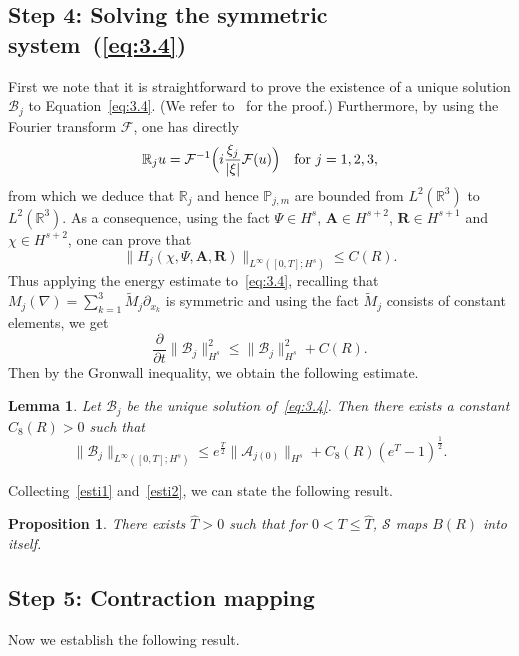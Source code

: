 \documentclass[10pt]{amsart}
\newtheorem{lemm}[theo]{Lemma}\newtheorem{prop}[theo]{Proposition}\newtheorem{coro}[theo]{Corollary}\newtheorem{conj}[theo]{Conjecture}
\theoremstyle{definition}\newtheorem{defi}[theo]{Definition}\newtheorem{rema}[theo]{Remark}\newtheorem{exam}[theo]{Example}\newtheorem{exem}[theo]{Example}\newtheorem{nota}[theo]{Notation}
\newcommand{\BA}{\mathbf{A}}
\newcommand{\BR}{\mathbf{R}}
\newcommand{\R}{\mathbb{R}}
\begin{document}
\subsection*{Step 4: Solving the symmetric system~(\ref{eq:3.4})}

First we note that it is straightforward to prove the existence of a unique solution $\mathcal{B}_j$ to Equation~\eqref{eq:3.4}. (We refer to~\cite[Proposition~1.2, p.~115]{AG} for the proof.) Furthermore, by using the Fourier transform $\mathcal{F}$, one has directly
\[
\mathbb{R}_j u =\mathcal{F}^{-1}\Big(i\frac{\xi_j}{|\xi |} \mathcal{F}(u)\Big)
\quad \hbox{for} \ j=1,2,3,
\]
from which we deduce that $\mathbb{R}_j$ and hence $\mathbb{P}_{j,m}$ are bounded from $L^2(\R^3)$ to $L^2(\R^3)$. As a consequence, using the fact $\Psi \in H^s$, $\BA \in H^{s+2}$, $\BR \in H^{s+1}$ and $\chi \in H^{s+2}$, one can prove that
\[
\| H_j(\chi, \Psi, \BA, \BR) \|_{L^{\infty}([0,T];H^s)} \le C(R).
\]
Thus applying the energy estimate to~\eqref{eq:3.4}, recalling that $M_j(\nabla)= \sum_{k=1}^3 \widetilde{M}_j \partial_{x_k}$ is symmetric and using the fact $\widetilde{M}_j$ consists of constant elements, we get
\[
\frac{\partial}{\partial t} \| \mathcal{B}_j \|_{H^s}^2
\le \| \mathcal{B}_j \|_{H^s}^2 +C(R).
\]
Then by the Gronwall inequality, we obtain the following estimate.

\begin{lemm}\label{hyper}
Let $\mathcal{B}_j$ be the unique solution of~\eqref{eq:3.4}. Then there exists a constant $C_8(R)>0$ such that
\begin{equation}\label{esti2}
\| \mathcal{B}_j \|_{L^{\infty}([0,T];H^s)}
\le e^{\frac{T}{2}} \| \mathcal{A}_{j(0)} \|_{H^s} +C_8(R) (e^T-1)^{\frac{1}{2}}.
\end{equation}
\end{lemm}

Collecting~\eqref{esti1} and~\eqref{esti2}, we can state the following result.

\begin{prop}\label{prop1}
There exists $\hat{T}>0$ such that for $0<T\leq \hat{T}$, $\mathcal{S}$ maps $B(R)$ into itself.
\end{prop}

\subsection*{Step 5: Contraction mapping}

Now we establish the following result.
\end{document}
